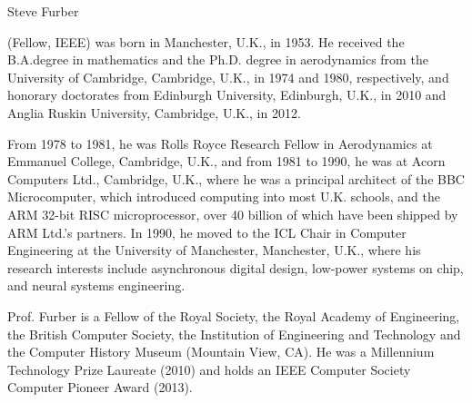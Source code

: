 \documentclass[journal]{journal}
\begin{document}
\begin{biography}{Steve Furber}

(Fellow, IEEE) was born in Manchester, U.K., in 1953. 
He received the B.A.degree in mathematics and the Ph.D. degree in aerodynamics from the University of Cambridge, Cambridge, U.K., in 1974 and 1980, respectively, and honorary doctorates from Edinburgh University, Edinburgh, U.K., in 2010 and Anglia Ruskin University, Cambridge, U.K., in 2012.

From 1978 to 1981, he was Rolls Royce Research Fellow in Aerodynamics at Emmanuel College, Cambridge, U.K., and from 1981 to 1990, he was at Acorn Computers Ltd., Cambridge, U.K., where he was a principal architect of the BBC Microcomputer, which introduced computing into most U.K. schools, and the ARM 32-bit RISC microprocessor, over 40 billion of which have been shipped by ARM Ltd.’s partners.
In 1990, he moved to the ICL Chair in Computer Engineering at the University of Manchester, Manchester, U.K., where his research interests include asynchronous
digital design, low-power systems on chip, and neural systems engineering.

Prof. Furber is a Fellow of the Royal Society, the Royal Academy of Engineering, the British Computer Society, the Institution of Engineering and Technology and the Computer History Museum (Mountain View, CA).
He was a Millennium Technology Prize Laureate (2010) and holds an IEEE Computer Society Computer Pioneer Award (2013).
\end{biography}
\end{document}
